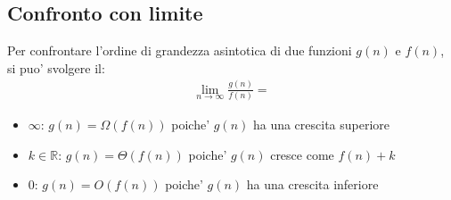 \documentclass{article}
\begin{document}
\subsection{Confronto con limite}

Per confrontare l'ordine di grandezza asintotica di due funzioni $g(n)$ e $f(n)$, si puo' svolgere il:
\begin{align*}
  \lim_{n \rightarrow \infty}{\frac{g(n)}{f(n)}} = 
\end{align*}
\begin{itemize}
  \item $\infty$: $g(n) = \Omega(f(n))$ poiche' $g(n)$ ha una crescita superiore
  \item $k \in \mathbb{R}$: $g(n) = \Theta(f(n))$ poiche' $g(n)$ cresce come $f(n)+k$
  \item $0$: $g(n) = O(f(n))$ poiche' $g(n)$ ha una crescita inferiore
\end{itemize}
\end{document}
